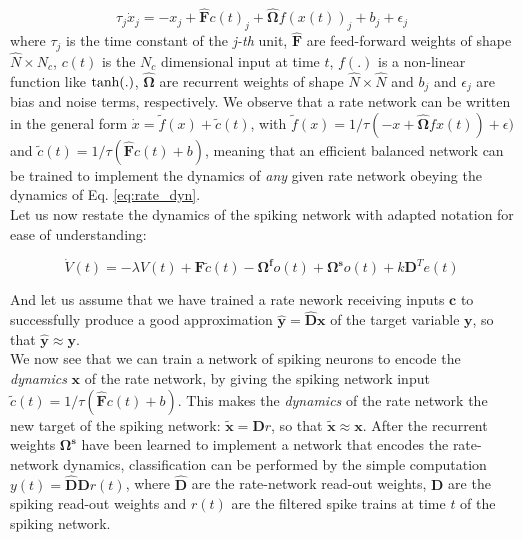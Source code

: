 \documentclass[twoside,11pt,titlepage]{article}
\begin{document}
\begin{equation} \label{eq:rate_dyn}
  \tau_j \dot{x}_j = -x_j + \hat{\mathbf{F}}c(t)_j + \hat{\mathbf{\Omega}}f(x(t))_j + b_j + \epsilon_j
\end{equation}
where $\tau_j$ is the time constant of the \textit{j-th} unit, $\hat{\mathbf{F}}$ are feed-forward weights of shape $\hat{N} \times N_c$, $c(t)$ is the $N_c$ dimensional input at time $t$,
$f(.)$ is a non-linear function like $\textnormal{tanh}(.)$, $\hat{\mathbf{\Omega}}$ are recurrent weights of shape $\hat{N} \times \hat{N}$ and $b_j$ and $\epsilon_j$ are bias and noise terms, respectively.
We observe that a rate network can be written in the general form $\dot{x} = \tilde{f}(x) + \tilde{c}(t)$, with $\tilde{f}(x) = 1/\tau(-x + \hat{\mathbf{\Omega}}fx(t))+ \epsilon)$
and $\tilde{c}(t)=1/\tau(\hat{\mathbf{F}}c(t) + b)$, meaning that an efficient balanced network can be trained to implement the dynamics of \textit{any} given rate network obeying the
dynamics of Eq. \ref{eq:rate_dyn}. \\
Let us now restate the dynamics of the spiking network with adapted notation for ease of understanding:

\begin{equation*}
  \dot{V}(t) = -\lambda V(t) + \mathbf{F}\tilde{c}(t) - \mathbf{\Omega^f}o(t) + \mathbf{\Omega^s}o(t) + k\mathbf{D}^Te(t)
\end{equation*}

And let us assume that we have trained a rate nework receiving inputs $\mathbf{c}$ to successfully produce a good approximation $\hat{\mathbf{y}} = \hat{\mathbf{D}}\mathbf{x}$ of the target
variable $\mathbf{y}$, so that $\hat{\mathbf{y}} \approx \mathbf{y}$. \\
We now see that we can train a network of spiking neurons to encode the \textit{dynamics} $\mathbf{x}$ of the rate network, by giving the spiking network
input $\tilde{c}(t)=1/\tau(\hat{\mathbf{F}}c(t) + b)$. This makes the \textit{dynamics} of the rate network the new target of the spiking network: $\tilde{\mathbf{x}}=\mathbf{D}r$,
so that $\tilde{\mathbf{x}} \approx \mathbf{x}$. After the recurrent weights $\mathbf{\Omega^s}$ have been learned to implement a network that encodes the rate-network dynamics, classification
can be performed by the simple computation $y(t) = \hat{\mathbf{D}}\mathbf{D}r(t)$, where $\hat{\mathbf{D}}$ are the rate-network read-out weights, $\mathbf{D}$ are the spiking read-out weights
and $r(t)$ are the filtered spike trains at time $t$ of the spiking network. \\
\end{document}
